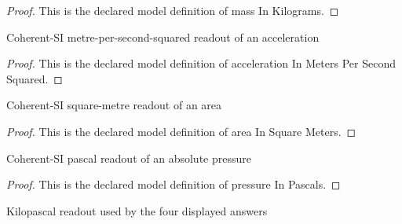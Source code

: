 \begin{proof}
  This is the declared model definition of mass In Kilograms.
\end{proof}
\begin{definition}
  \label{def:physics:phyx-mini-0384:phyxminiproblems-problemphyxmini0384-accelerationinmeterspersecondsquared}
  Coherent-SI metre-per-second-squared readout of an acceleration
\end{definition}
\begin{proof}
  This is the declared model definition of acceleration In Meters Per Second Squared.
\end{proof}
\begin{definition}
  \label{def:physics:phyx-mini-0384:phyxminiproblems-problemphyxmini0384-areainsquaremeters}
  Coherent-SI square-metre readout of an area
\end{definition}
\begin{proof}
  This is the declared model definition of area In Square Meters.
\end{proof}
\begin{definition}
  \label{def:physics:phyx-mini-0384:phyxminiproblems-problemphyxmini0384-pressureinpascals}
  Coherent-SI pascal readout of an absolute pressure
\end{definition}
\begin{proof}
  This is the declared model definition of pressure In Pascals.
\end{proof}
\begin{definition}
  \label{def:physics:phyx-mini-0384:phyxminiproblems-problemphyxmini0384-pressureinkilopascals}
  Kilopascal readout used by the four displayed answers
\end{definition}
